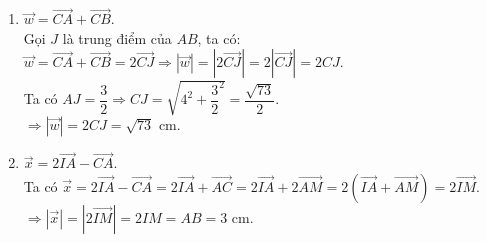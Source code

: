 \begin{bt}
{			\begin{enumerate}
			\item[b)] $\overrightarrow{w}=\overrightarrow{CA}+\overrightarrow{CB}$. \\
			Gọi $J$ là trung điểm của $AB$, ta có:\\
			$\overrightarrow{w}=\overrightarrow{CA}+\overrightarrow{CB}=2\overrightarrow{CJ}\Rightarrow \left|\overrightarrow{w}\right|=\left|2\overrightarrow{CJ}\right|=2\left|\overrightarrow{CJ}\right|=2CJ$.\\
			Ta có $AJ=\dfrac{3}{2}\Rightarrow CJ=\sqrt{4^2+{\dfrac{3}{2}}^2}=\dfrac{\sqrt{73}}{2}$.\\
			$\Rightarrow \left|\overrightarrow{w}\right|=2CJ=\sqrt{73}$ cm.
			\item[c)] $\overrightarrow{x}=2\overrightarrow{IA}-\overrightarrow{CA}$.\\
			Ta có $\overrightarrow{x}=2\overrightarrow{IA}-\overrightarrow{CA}=2\overrightarrow{IA}+\overrightarrow{AC}=2\overrightarrow{IA}+2\overrightarrow{AM}=2\left(\overrightarrow{IA}+\overrightarrow{AM} \right)=2\overrightarrow{IM}$.\\
			$\Rightarrow \left|\overrightarrow{x}\right|=\left|2\overrightarrow{IM}\right|=2IM=AB=3$ cm.
		\end{enumerate}
	}
\end{bt}
